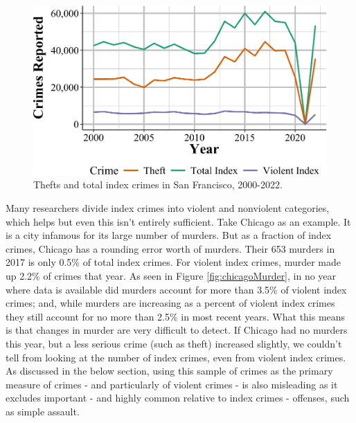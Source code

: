 \documentclass[
  12pt,
  openany]{book}
\begin{document}
\begin{figure}

{\centering \includegraphics[width=0.9\linewidth]{03_offenses_known_files/figure-latex/sfThefts-1} 

}

\caption{Thefts and total index crimes in San Francisco, 2000-2022.}\label{fig:sfThefts}
\end{figure}

Many researchers divide index crimes into violent and nonviolent categories, which helps but even this isn't entirely sufficient. Take Chicago as an example. It is a city infamous for its large number of murders. But as a fraction of index crimes, Chicago has a rounding error worth of murders. Their 653 murders in 2017 is only 0.5\% of total index crimes. For violent index crimes, murder made up 2.2\% of crimes that year. As seen in Figure \ref{fig:chicagoMurder}, in no year where data is available did murders account for more than 3.5\% of violent index crimes; and, while murders are increasing as a percent of violent index crimes they still account for no more than 2.5\% in most recent years. What this means is that changes in murder are very difficult to detect. If Chicago had no murders this year, but a less serious crime (such as theft) increased slightly, we couldn't tell from looking at the number of index crimes, even from violent index crimes. As discussed in the below section, using this sample of crimes as the primary measure of crimes - and particularly of violent crimes - is also misleading as it excludes important - and highly common relative to index crimes - offenses, such as simple assault.
\end{document}

